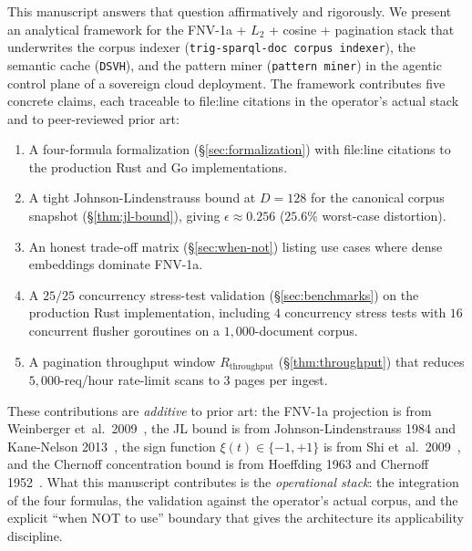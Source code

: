 \documentclass[10pt,twocolumn]{article}
\theoremstyle{definition}
\theoremstyle{remark}
\begin{document}
This manuscript answers that question affirmatively and rigorously. We
present an analytical framework for the FNV-1a + $L_2$ + cosine +
pagination stack that underwrites the corpus indexer
(\texttt{trig-sparql-doc corpus indexer}), the semantic cache
(\texttt{DSVH}), and the pattern miner
(\texttt{pattern miner}) in the agentic control plane of a
sovereign cloud deployment. The framework contributes five concrete
claims, each traceable to file:line citations in the operator's actual
stack and to peer-reviewed prior art:

\begin{enumerate}
    \item A four-formula formalization (\S\ref{sec:formalization}) with
    file:line citations to the production Rust and Go implementations.

    \item A tight Johnson-Lindenstrauss bound at $D = 128$ for the
    canonical corpus snapshot (\S\ref{thm:jl-bound}), giving
    $\epsilon \approx 0.256$ ($25.6\%$ worst-case distortion).

    \item An honest trade-off matrix (\S\ref{sec:when-not}) listing use
    cases where dense embeddings dominate FNV-1a.

    \item A $25/25$ concurrency stress-test validation (\S\ref{sec:benchmarks}) on the
    production Rust implementation, including $4$ concurrency stress
    tests with $16$ concurrent flusher goroutines on a $1{,}000$-document
    corpus.

    \item A pagination throughput window $R_{\text{throughput}}$
    (\S\ref{thm:throughput}) that reduces $5{,}000$-req/hour rate-limit
    scans to $3$ pages per ingest.
\end{enumerate}

These contributions are \emph{additive} to prior art: the FNV-1a
projection is from Weinberger et~al.\ 2009~\citep{weinberger2009feature},
the JL bound is from Johnson-Lindenstrauss 1984 and Kane-Nelson
2013~\citep{johnson1984extensions,kane2013jl}, the sign function
$\xi(t) \in \{-1, +1\}$ is from Shi et~al.\ 2009~\citep{shi2009hash}, and
the Chernoff concentration bound is from Hoeffding 1963 and
Chernoff 1952~\citep{hoeffding1963,chernoff1952}. What this manuscript
contributes is the \emph{operational stack}: the integration of the four
formulas, the validation against the operator's actual corpus, and the
explicit ``when NOT to use'' boundary that gives the architecture its
applicability discipline.
\end{document}
